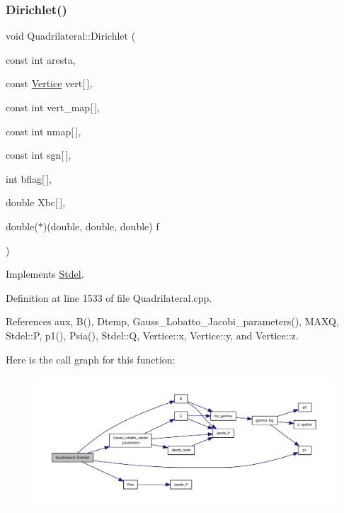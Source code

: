\subsubsection{\texorpdfstring{Dirichlet()}{Dirichlet()}}
{\footnotesize\ttfamily void Quadrilateral\+::\+Dirichlet (\begin{DoxyParamCaption}\item[{const int}]{aresta,  }\item[{const \hyperlink{structVertice}{Vertice}}]{vert\mbox{[}$\,$\mbox{]},  }\item[{const int}]{vert\+\_\+map\mbox{[}$\,$\mbox{]},  }\item[{const int}]{nmap\mbox{[}$\,$\mbox{]},  }\item[{const int}]{sgn\mbox{[}$\,$\mbox{]},  }\item[{int}]{bflag\mbox{[}$\,$\mbox{]},  }\item[{double}]{Xbc\mbox{[}$\,$\mbox{]},  }\item[{double($\ast$)(double, double, double)}]{f }\end{DoxyParamCaption})\hspace{0.3cm}{\ttfamily [virtual]}}



Implements \hyperlink{classStdel_a92e13b000249ba73b35407d925cbd7a8}{Stdel}.



Definition at line 1533 of file Quadrilateral.\+cpp.



References aux, B(), Dtemp, Gauss\+\_\+\+Lobatto\+\_\+\+Jacobi\+\_\+parameters(), M\+A\+XQ, Stdel\+::P, p1(), Psia(), Stdel\+::Q, Vertice\+::x, Vertice\+::y, and Vertice\+::z.

Here is the call graph for this function\+:
\nopagebreak
\begin{figure}[H]
\begin{center}
\leavevmode
\includegraphics[width=350pt]{classQuadrilateral_a98e726588eff16203239599aabe7d8db_cgraph}
\end{center}
\end{figure}
\mbox{\label{classStdel_a922b779be1f8f12b7a5535ab529bff64}} 
